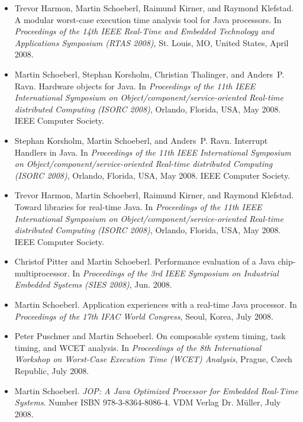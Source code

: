 \begin{itemize}
\item Trevor Harmon, Martin Schoeberl, Raimund Kirner, and
    Raymond Klefstad. A modular worst-case execution time
    analysis tool for Java
  processors. In {\em Proceedings of the 14th IEEE Real-Time and
 Embedded Technology and Applications Symposium (RTAS 2008)}, St.
 Louis, MO, United States, April 2008.

\item Martin Schoeberl, Stephan Korsholm, Christian Thalinger,
    and Anders~P. Ravn. Hardware objects for {Java}. In {\em
    Proceedings of the 11th IEEE International Symposium on
  Object/component/service-oriented Real-time distributed
  Computing (ISORC 2008)}, Orlando, Florida, USA, May 2008. IEEE
  Computer Society.

\item Stephan Korsholm, Martin Schoeberl, and Anders~P. Ravn.
    Interrupt Handlers in {Java}.
 In {\em Proceedings of the 11th IEEE International Symposium on
  Object/component/service-oriented Real-time distributed
  Computing (ISORC 2008)}, Orlando, Florida, USA, May 2008. IEEE
  Computer Society.

\item Trevor Harmon, Martin Schoeberl, Raimund Kirner, and
    Raymond Klefstad. Toward libraries for real-time Java. In
    {\em Proceedings of the 11th IEEE International Symposium on
    Object/component/service-oriented Real-time distributed
  Computing (ISORC 2008)}, Orlando, Florida, USA, May 2008. IEEE
  Computer Society.

\item Christof Pitter and Martin Schoeberl. Performance
    evaluation of a {Java} chip-multiprocessor. In {\em
    Proceedings of the 3rd IEEE Symposium on Industrial Embedded
    Systems (SIES 2008)}, Jun. 2008.

\item Martin Schoeberl. Application experiences with a real-time
    {J}ava processor. In {\em Proceedings of the 17th IFAC World
    Congress}, Seoul, Korea, July 2008.

\item Peter Puschner and Martin Schoeberl. On composable system
    timing, task timing, and WCET analysis. In {\em Proceedings
    of the 8th International Workshop on Worst-Case Execution
    Time (WCET) Analysis}, Prague, Czech
  Republic, July 2008.

\item Martin Schoeberl. {\em JOP: A Java Optimized Processor for
    Embedded Real-Time Systems}. Number ISBN 978-3-8364-8086-4.
    VDM Verlag Dr. M{\"u}ller, July 2008.


\end{itemize}
